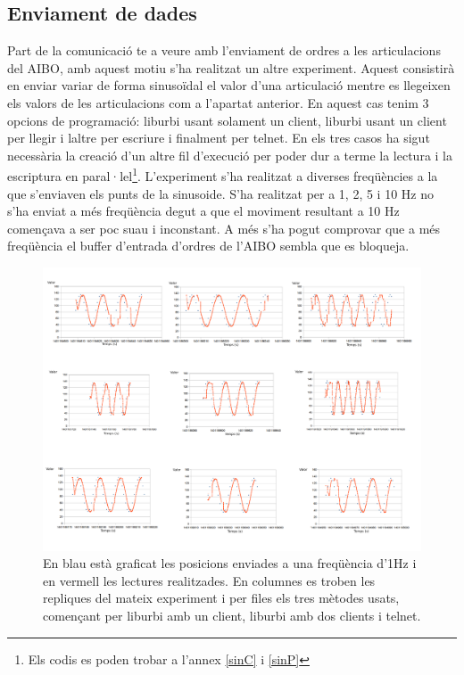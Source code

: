 \documentclass[12pt,a4paper,final,twoside]{article}
\begin{document}
\subsection{Enviament de dades}\label{secenvdades}
Part de la comunicació te a veure amb l'enviament de ordres a les articulacions del AIBO, amb aquest motiu s'ha realitzat un altre experiment. 
Aquest consistirà en enviar variar de forma sinusoïdal el valor d'una articulació mentre es llegeixen els valors de les articulacions com a l'apartat anterior. 
En aquest cas tenim 3 opcions de programació: liburbi usant solament un client, liburbi usant un client per llegir i laltre per escriure i finalment per telnet.
En els tres casos ha sigut necessària la creació d'un altre fil d'execució per poder dur a terme la lectura i la escriptura en paral·lel\footnote{Els codis es poden trobar a l'annex \ref{sinC} i \ref{sinP}}.
L'experiment s'ha realitzat a diverses freqüències a la que s'enviaven els punts de la sinusoide. S'ha realitzat per a 1, 2, 5 i 10 Hz no s'ha enviat a més freqüència degut a que el moviment resultant a 10 Hz començava a ser poc suau i inconstant. A més s'ha pogut comprovar que a més freqüència el buffer d'entrada d'ordres de l'AIBO sembla que es bloqueja.  
\begin{figure}[H]
	\centering
    \includegraphics[scale=0.33]{images/sin1H.pdf}
	 \caption{En blau està graficat les posicions enviades a una freqüència d'1Hz i en vermell les lectures realitzades. En columnes es troben les repliques del mateix experiment i per files els tres mètodes usats, començant per liburbi amb un client, liburbi amb dos clients i telnet.}
  \label{fig:sin1H}
\end{figure}
\end{document}
